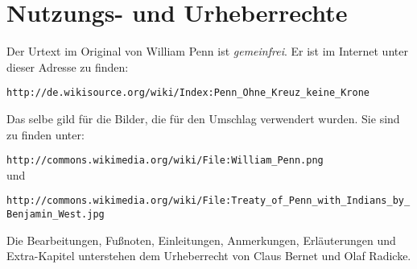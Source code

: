 \chapter{Nutzungs- und Urheberrechte}
Der Urtext im Original von William Penn ist \textit{gemeinfrei}. Er ist im Internet
unter dieser Adresse zu finden:

\begin{center}
\texttt{http://de.wikisource.org/wiki/Index:Penn\_Ohne\_Kreuz\_keine\_Krone}
\end{center}

Das selbe gild für die Bilder, die für den Umschlag verwendert wurden. Sie sind zu finden unter:

\begin{center}
\texttt{http://commons.wikimedia.org/wiki/File:William\_Penn.png}\\
und\\
\begin{footnotesize}
\texttt{http://commons.wikimedia.org/wiki/File:Treaty\_of\_Penn\_with\_Indians\_by\_Benjamin\_West.jpg}\\
\end{footnotesize}
\end{center}

Die Bearbeitungen, Fußnoten, Einleitungen, Anmerkungen, Erläuterungen und
Extra-Kapitel unterstehen dem Urheberrecht von Claus Bernet und Olaf Radicke.



